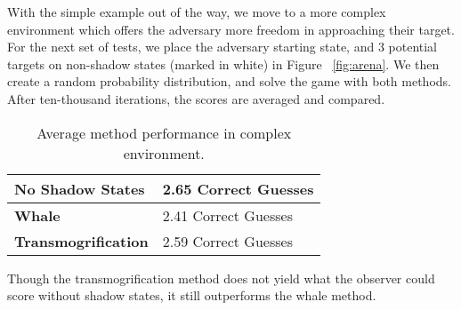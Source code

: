 With the simple example out of the way, we move to a more complex environment which offers the adversary more freedom in approaching their target. For the next set of tests, we place the adversary starting state, and 3 potential targets on non-shadow states (marked in white) in Figure ~\ref{fig:arena}. We then create a random probability distribution, and solve the game with both methods. After ten-thousand iterations, the scores are averaged and compared. 

\begin{table}[hbtp]
\begin{center}
\begin{tabular}{|l|l|}
\hline 
\textbf{No Shadow States} & 2.65 Correct Guesses\\
\hline
\textbf{Whale} & 2.41 Correct Guesses\\
\hline
\textbf{Transmogrification} & 2.59 Correct Guesses\\
\hline
\end{tabular}
\end{center}
\caption{Average method performance in complex environment.}
\label{table:simpletable}
\end{table}

Though the transmogrification method does not yield what the observer could score without shadow states, it still outperforms the whale method.

\nocite{Dijkstra80}
\nocite{plop03-paper}
